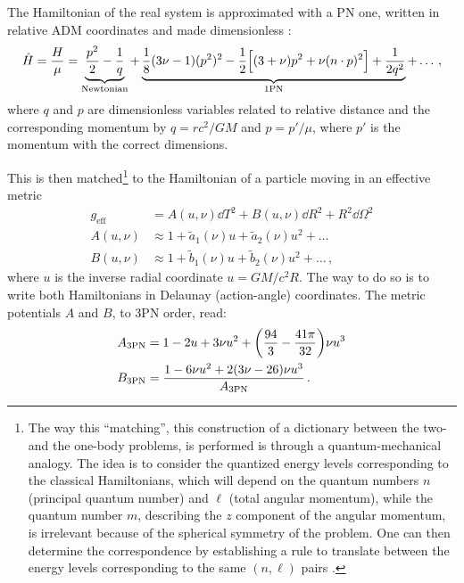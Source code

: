 \documentclass[main.tex]{subfiles}
\begin{document}
The Hamiltonian of the real system is approximated with a \ac{PN} one, written in relative \ac{ADM} coordinates and made dimensionless \cite[eqs.\ 4--5]{damourGeneralRelativisticTwo2014}: 
%
\begin{align}
\hat{H} = \frac{H}{\mu } = \underbrace{\frac{p^2}{2} - \frac{1}{q}}_{\text{Newtonian}} 
+ \underbrace{\frac{1}{8} (3 \nu -1 ) (p^2)^2 - \frac{1}{2} \qty[(3+\nu ) p^2 + \nu (n \cdot p)^2] + \frac{1}{2 q^2}}_{\text{1PN}} + \dots
\,,
\end{align}
% 
where \(q\) and \(p\) are dimensionless variables related to relative distance and the corresponding
momentum by \(q = r c^2 / GM\) and \(p = p' / \mu \), where \(p'\) is the momentum with the correct dimensions.  

This is then matched\footnote{The way this ``matching'', this construction of a dictionary between the two- and the one-body problems, is performed is through a quantum-mechanical analogy. The idea is to consider the quantized energy levels corresponding to the classical Hamiltonians, which will depend on the quantum numbers \(n\) (principal quantum number) and \(\ell\) (total angular momentum),  while the quantum number \(m\), describing  the \(z\) component of the angular momentum, is irrelevant because of the spherical symmetry of the problem. One can then determine the correspondence by establishing a rule to translate between the energy levels corresponding to the same \((n, \ell)\) pairs \cite{damourGeneralRelativisticTwo2014}.} to the Hamiltonian of a particle moving in an effective metric 
%
\begin{align}
g _{\text{eff}} &= A(u, \nu ) \dd{T^2} + B(u, \nu) \dd{R^2} + R^2 \dd{\Omega^2}  \\
A(u, \nu ) &\approx 1 + \widetilde{a}_1 (\nu ) u + \widetilde{a}_2 (\nu ) u^2 + \dots  \\
B(u, \nu ) &\approx 1 + \widetilde{b}_1 (\nu ) u + \widetilde{b}_2 (\nu ) u^2 + \dots  
\,,
\end{align}
%
where \(u\) is the inverse radial coordinate \(u = GM / c^2 R\). 
The way to do so is to write both Hamiltonians in Delaunay (action-angle) coordinates. 
The metric potentials \(A\) and \(B\), to 3PN order, read: 
%
\begin{align}
A _{\text{3PN}} &= 1 - 2u + 3 \nu u^2 + \qty( \frac{94}{3} - \frac{41 \pi }{32}) \nu u^3  \\
B _{\text{3PN}} &= \frac{1 - 6 \nu u^2 + 2 (3 \nu - 26) \nu u^3}{A _{\text{3PN}}}
\,.
\end{align}
\end{document}
